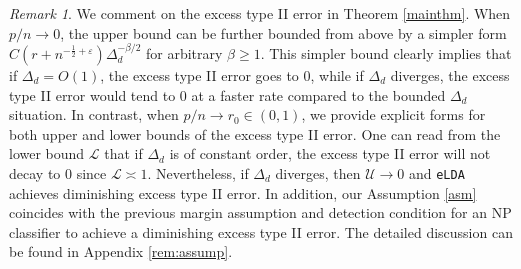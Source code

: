 \documentclass[12pt]{article}
\numberwithin{equation}{section}
\newtheorem{thm}{Theorem}
\theoremstyle{remark}
\newtheorem{myRem}{Remark}
\newcommand{\1}{{\rm 1}\kern-0.24em{\rm I}}
\begin{document}
\begin{myRem}
We comment on the excess type II error in Theorem \ref{mainthm}. When $p/n\to 0$,  the upper bound can be further bounded from above by a simpler form $C\left(r + n^{-\frac12+ \varepsilon}\right)\varDelta_d^{-\beta/2}$ for arbitrary $\beta\geq 1$. This simpler bound clearly implies that if $\varDelta_d=O(1)$, the excess type II error goes to 0, while if $ \varDelta_d$ diverges, the excess type II error would tend to $0$ at a faster rate compared to the bounded $\varDelta_d$ situation.  In contrast, when $p/n\to r_0\in(0,1)$, we provide explicit forms for both upper and lower bounds of the excess type II error. One can read from the lower bound $\mathcal{L}$ that if $\varDelta_d$ is of constant order, the excess type II error will not decay to $0$ since $\mathcal{L}\asymp 1$. Nevertheless, if $\varDelta_d$ diverges, then $\mathcal{U}\to 0$ and \verb+eLDA+ achieves diminishing excess type II error. In addition,  our Assumption \ref{asm} coincides with the previous margin assumption and detection condition \citep{tong2013plug, zhao2016neyman, Tong.Xia.Wang.Feng.2020} for an NP classifier to achieve a diminishing excess type II error. The detailed  discussion can be found in Appendix \ref{rem:assump}.
\end{myRem}



%
%


\end{document}

